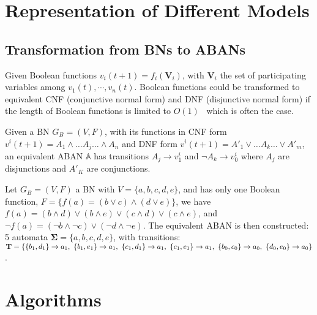 \chapter{Representation of Different Models}
\section{Transformation from BNs to ABANs}\label{appendix:trans}

Given Boolean functions $v_i(t+1)=f_i(\mathbf{V}_i)$, with $\mathbf{V}_i$ the set of participating variables among $v_1(t),\cdots,v_n(t)$.
Boolean functions could be transformed to equivalent CNF (conjunctive normal form) and DNF (disjunctive normal form) if the length of Boolean functions is limited to $O(1)$~\cite{miltersen2005converting} which is often the case.

\begin{proposition}
Given a BN $G_B=(V,F)$, with its functions in CNF form $v^i(t+1)=A_1\land\ldots A_j \ldots\land A_n$ and DNF form $v^i(t+1)=A'_1\lor\ldots A_k\ldots\lor A'_m$, an equivalent ABAN $\mathbb{A}$ has transitions $A_j\to v^i_1$ and $\lnot A_k\to v^i_0$ where $A_j$ are disjunctions and $A'_K$ are conjunctions.
\end{proposition}

\begin{example}
Let $G_B=(V,F)$ a BN with $V=\{a,b,c,d,e\}$, and has only one Boolean function, $F=\{f(a)= (b\lor c)\land(d\lor e)\}$, we have 
$f(a)=(b\land d)\lor(b\land e)\lor(c\land d)\lor(c\land e)$, and $\lnot f(a)=(\lnot b\land \lnot c)\lor(\lnot d\land \lnot e)$. 
The equivalent ABAN is then constructed: 5 automata $\mathbf{\Sigma}=\{a,b,c,d,e\}$, with transitions: $\mathbf{T}=\{\acm{b_1,d_1}{a_0}{a_1},\ \acm{b_1,e_1}{a_0}{a_1},\ \acm{c_1,d_1}{a_0}{a_1},\ \acm{c_1,e_1}{a_0}{a_1},\ \acm{b_0,c_0}{a_1}{a_0},\ \acm{d_0,e_0}{a_1}{a_0}\}$.
\end{example}



\chapter{Algorithms}\label{chap:algo}

